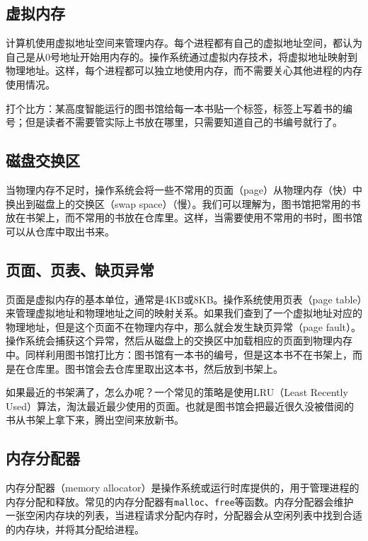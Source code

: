 \documentclass[../main.tex]{subfiles}
\begin{document}
\subsection{虚拟内存}

计算机使用虚拟地址空间来管理内存。每个进程都有自己的虚拟地址空间，都认为自己是从0号地址开始用内存的。操作系统通过虚拟内存技术，将虚拟地址映射到物理地址。这样，每个进程都可以独立地使用内存，而不需要关心其他进程的内存使用情况。

打个比方：某高度智能运行的图书馆给每一本书贴一个标签，标签上写着书的编号；但是读者不需要管实际上书放在哪里，只需要知道自己的书编号就行了。

\subsection{磁盘交换区}

当物理内存不足时，操作系统会将一些不常用的页面（page）从物理内存（快）中换出到磁盘上的交换区（swap space）（慢）。我们可以理解为，图书馆把常用的书放在书架上，而不常用的书放在仓库里。这样，当需要使用不常用的书时，图书馆可以从仓库中取出书来。

\subsection{页面、页表、缺页异常}

页面是虚拟内存的基本单位，通常是4KB或8KB。操作系统使用页表（page table）来管理虚拟地址和物理地址之间的映射关系。如果我们查到了一个虚拟地址对应的物理地址，但是这个页面不在物理内存中，那么就会发生缺页异常（page fault）。操作系统会捕获这个异常，然后从磁盘上的交换区中加载相应的页面到物理内存中。同样利用图书馆打比方：图书馆有一本书的编号，但是这本书不在书架上，而是在仓库里。图书馆会去仓库里取出这本书，然后放到书架上。

如果最近的书架满了，怎么办呢？一个常见的策略是使用LRU（Least Recently Used）算法，淘汰最近最少使用的页面。也就是图书馆会把最近很久没被借阅的书从书架上拿下来，腾出空间来放新书。

\subsection{内存分配器}

内存分配器（memory allocator）是操作系统或运行时库提供的，用于管理进程的内存分配和释放。常见的内存分配器有\texttt{malloc}、\texttt{free}等函数。内存分配器会维护一张空闲内存块的列表，当进程请求分配内存时，分配器会从空闲列表中找到合适的内存块，并将其分配给进程。
\end{document}
